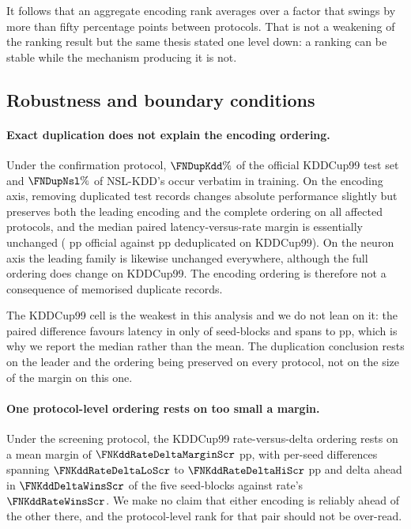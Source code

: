It follows that an aggregate encoding rank averages over a factor that swings by
more than fifty percentage points between protocols. That is not a weakening of
the ranking result but the same thesis stated one level down: a ranking can be
stable while the mechanism producing it is not.

\subsection{Robustness and boundary conditions}
\label{sec:res-limits}

\paragraph{Exact duplication does not explain the encoding ordering.}
Under the confirmation protocol,
$\FNDupKdd\%$ of the official KDDCup99 test set and $\FNDupNsl\%$ of NSL-KDD's
occur verbatim in training. On the encoding axis, removing duplicated test
records changes absolute performance slightly but preserves both the leading
encoding and the complete ordering on all \FNDedupProtocols{} affected
protocols, and the median paired latency-versus-rate margin is essentially unchanged
(\FNDedupKddOffMedian{} pp official against \FNDedupKddDedMedian{} pp deduplicated on
KDDCup99). On the neuron axis the leading family is likewise unchanged
everywhere, although the full ordering does change on KDDCup99. The encoding
ordering is therefore not a consequence of memorised duplicate records.

The KDDCup99 cell is the weakest in this analysis and we do not lean on it: the
paired difference favours latency in only \FNDedupKddSeedWins{} of
\FNDedupKddSeedN{} seed-blocks and spans \FNDedupKddSeedLo{} to
\FNDedupKddSeedHi{} pp, which is why we report the median rather than the mean.
The duplication conclusion rests on the leader and the ordering being preserved
on every protocol, not on the size of the margin on this one.

\paragraph{One protocol-level ordering rests on too small a margin.}
Under the screening protocol, the KDDCup99 rate-versus-delta ordering rests on
a mean margin of $\FNKddRateDeltaMarginScr$ pp, with per-seed differences spanning
$\FNKddRateDeltaLoScr$ to $\FNKddRateDeltaHiScr$ pp and delta ahead in
$\FNKddDeltaWinsScr$ of the five seed-blocks against rate's $\FNKddRateWinsScr$. We
make no claim that either encoding is reliably ahead of the other there, and the
protocol-level rank for that pair should not be over-read.

